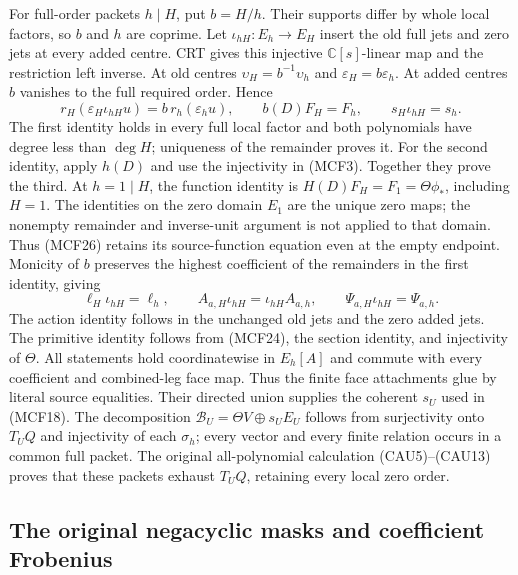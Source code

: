 For full-order packets $h\mid H$, put $b=H/h$.  Their supports differ by
whole local factors, so $b$ and $h$ are coprime.  Let
$\iota_{hH}:E_h\to E_H$ insert the old full jets and zero jets at every
added centre.  CRT gives this injective $\mathbb C[s]$-linear map and
the restriction left inverse.  At old centres $\upsilon_H=b^{-1}\upsilon_h$
and $\varepsilon_H=b\varepsilon_h$.  At added centres $b$ vanishes to
the full required order.  Hence
\[
r_H(\varepsilon_H\iota_{hH}u)=b\,r_h(\varepsilon_hu),\qquad
b(D)F_H=F_h,\qquad s_H\iota_{hH}=s_h.
\tag{MCF26}
\]
The first identity holds in every full local factor and both polynomials
have degree less than $\deg H$; uniqueness of the remainder proves it.
For the second identity, apply $h(D)$ and use the injectivity in (MCF3).
Together they prove the third. At $h=1\mid H$, the function
identity is $H(D)F_H=F_1=\Theta\phi_*$, including $H=1$.
The identities on the zero domain $E_1$ are the unique zero maps;
the nonempty remainder and inverse-unit argument is not applied to
that domain. Thus (MCF26) retains its source-function equation even
at the empty endpoint. Monicity of $b$ preserves the highest
coefficient of the remainders in the first identity, giving
\[
\ell_H\iota_{hH}=\ell_h,\qquad
A_{a,H}\iota_{hH}=\iota_{hH}A_{a,h},\qquad
\Psi_{a,H}\iota_{hH}=\Psi_{a,h}.
\tag{MCF27}
\]
The action identity follows in the unchanged old jets and the zero added
jets.  The primitive identity follows from (MCF24), the section identity,
and injectivity of $\Theta$.  All statements hold coordinatewise in
$E_h[A]$ and commute with every coefficient and combined-leg face map.
Thus the finite face attachments glue by literal source equalities.
Their directed union supplies the coherent $s_U$ used in (MCF18).
The decomposition $\mathscr B_U=\Theta V\oplus s_UE_U$ follows from
surjectivity onto $T_UQ$ and injectivity of each $\sigma_h$; every vector
and every finite relation occurs in a common full packet.  The original
all-polynomial calculation (CAU5)--(CAU13) proves that these packets
exhaust $T_UQ$, retaining every local zero order.

\subsection{The original negacyclic masks and coefficient Frobenius}

